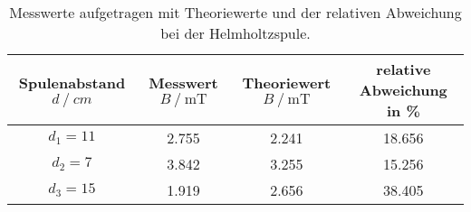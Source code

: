 \begin{table}
\centering
\caption{Messwerte aufgetragen mit Theoriewerte und der relativen Abweichung bei der Helmholtzspule.}
    \begin{tabular}{c|ccc}
    \toprule
 Spulenabstand $d\:/\:\si{cm}$ &  Messwert $B\:/\: \si{\milli\tesla}$ & Theoriewert $B\:/\: \si{\milli\tesla}$ & relative Abweichung in \% \\
    \midrule
    $d_1= 11$ & 2.755 & 2.241 & 18.656\\
    $d_2= 7$ & 3.842 & 3.255 & 15.256 \\
    $d_3= 15$ & 1.919 & 2.656 & 38.405 \\
    \bottomrule
    \end{tabular}
    \label{tab:disk2}
\end{table}
